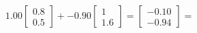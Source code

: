 \documentclass[preview]{standalone}
\begin{document}
\begin{align*}
1.00 \begin{bmatrix} 0.8 \\ 0.5 \end{bmatrix} + -0.90 \begin{bmatrix} 1 \\ 1.6 \end{bmatrix} = \begin{bmatrix} -0.10 \\ -0.94 \end{bmatrix} =
\end{align*}
\end{document}
